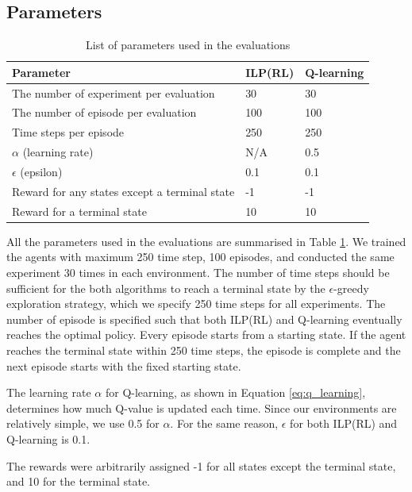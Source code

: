 \subsection{Parameters}
\begin{table}[!ht!b]
\centering
\begin{tabular}{lll}
\hline
Parameter            & ILP(RL)    & Q-learning      \\ \hline
The number of experiment per evaluation& 30       & 30       \\
The number of episode per evaluation& 100        & 100        \\
Time steps per episode& 250        & 250        \\
$\alpha$ (learning rate)        & N/A       & 0.5       \\
$\epsilon$ (epsilon)         & 0.1        & 0.1        \\
Reward for any states except a terminal state  & -1        & -1       \\
Reward for a terminal state     & 10        & 10       \\
\end{tabular}
\caption{List of parameters used in the evaluations}
\label{table:parameter}
\end{table}

All the parameters used in the evaluations are summarised in Table \ref{table:parameter}.
We trained the agents with maximum 250 time step, 100 episodes, and conducted the same experiment 30 times in each environment. 
The number of time steps should be sufficient for the both algorithms to reach a terminal state by the $\epsilon$-greedy exploration strategy, 
which we specify 250 time steps for all experiments. 
The number of episode is specified such that both ILP(RL) and Q-learning eventually reaches the optimal policy.
Every episode starts from a starting state. If the agent reaches the terminal state within 250 time steps, the episode is complete and the next episode starts with the fixed starting state. 

The learning rate  $\alpha$ for Q-learning, as shown in Equation \ref{eq:q_learning}, determines how much Q-value is updated each time. Since our environments are relatively simple, we use 0.5 for $\alpha$. For the same reason, $\epsilon$ for both ILP(RL) and Q-learning is 0.1.

The rewards were arbitrarily assigned -1 for all states except the terminal state, and 10 for the terminal state.

